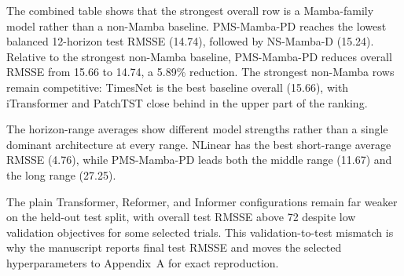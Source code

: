 The combined table shows that the strongest overall row is a Mamba-family model rather than a non-Mamba baseline.
PMS-Mamba-PD reaches the lowest balanced 12-horizon test RMSSE (14.74), followed by NS-Mamba-D (15.24).
Relative to the strongest non-Mamba baseline, PMS-Mamba-PD reduces overall RMSSE from 15.66 to 14.74, a 5.89\% reduction.
The strongest non-Mamba rows remain competitive: TimesNet is the best baseline overall (15.66), with iTransformer and PatchTST close behind in the upper part of the ranking.

The horizon-range averages show different model strengths rather than a single dominant architecture at every range.
NLinear has the best short-range average RMSSE (4.76), while PMS-Mamba-PD leads both the middle range (11.67) and the long range (27.25).

The plain Transformer, Reformer, and Informer configurations remain far weaker on the held-out test split, with overall test RMSSE above 72 despite low validation objectives for some selected trials.
This validation-to-test mismatch is why the manuscript reports final test RMSSE and moves the selected hyperparameters to Appendix~A for exact reproduction.
